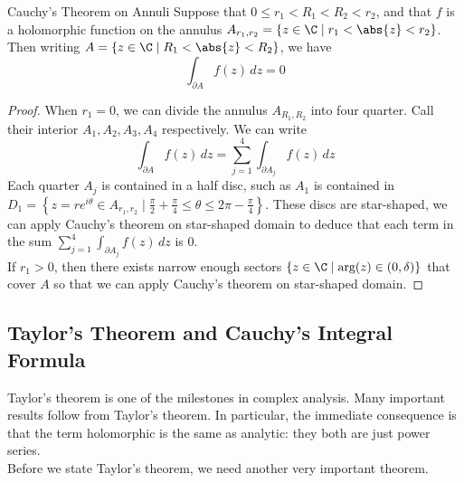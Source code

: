 \documentclass[a4paper]{article}
\begin{document}
\begin{crl}{Cauchy's Theorem on Annuli}{} Suppose that $0\leq r_1<R_1<R_2<r_2$, and that $f$ is a holomorphic function on the annulus $A_{r_1,r_2}=\{z\in\C\;|\; r_1<\abs{z}<r_2\}$. Then writing $A=\{z\in\C\;|\; R_1<\abs{z}<R_2\}$, we have $$\int_{\partial A}f(z)\,dz=0$$ 
\begin{proof}
When $r_1=0$, we can divide the annulus $A_{R_1,R_2}$ into four quarter. Call their interior $A_1,A_2,A_3,A_4$ respectively. We can write $$\int_{\partial A}f(z)\,dz=\sum_{j=1}^4\int_{\partial A_j}f(z)\,dz$$ Each quarter $A_j$ is contained in a half disc, such as $A_1$ is contained in $D_1=\left\{z=re^{i\theta}\in A_{r_1,r_2}\;|\; \frac{\pi}{2}+\frac{\pi}{4}\leq\theta\leq 2\pi-\frac{\pi}{4}\right\}$. These discs are star-shaped, we can apply Cauchy's theorem on star-shaped domain to deduce that each term in the sum $\sum_{j=1}^4\int_{\partial A_j}f(z)\,dz$ is $0$. \\

If $r_1>0$, then there exists narrow enough sectors $\{z\in\C\;|\;\text{arg}(z)\in(0,\delta)\}$ that cover $A$ so that we can apply Cauchy's theorem on star-shaped domain. 
\end{proof}
\end{crl}

\subsection{Taylor's Theorem and Cauchy's Integral Formula}
Taylor's theorem is one of the milestones in complex analysis. Many important results follow from Taylor's theorem. In particular, the immediate consequence is that the term holomorphic is the same as analytic: they both are just power series. \\

Before we state Taylor's theorem, we need another very important theorem. 
\end{document}
